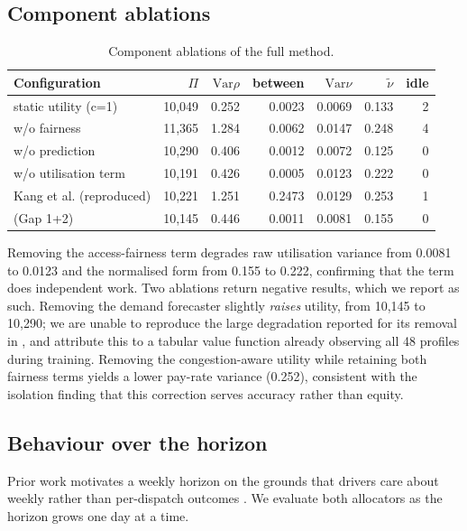 \documentclass[10pt,twocolumn]{article}
\begin{document}
\subsection{Component ablations}
\begin{table}[t]
\centering
\caption{Component ablations of the full method.}
\label{tab:ablation}
\footnotesize
\begin{tabular}{lrrrrrr}
\toprule
Configuration & \(\Pi\) & \(\mathrm{Var}\rho\) & between & \(\mathrm{Var}\nu\) & \(\tilde{\nu}\) & idle \\
\midrule
static utility (c=1) & 10,049 & 0.252 & 0.0023 & 0.0069 & 0.133 & 2 \\
w/o fairness & 11,365 & 1.284 & 0.0062 & 0.0147 & 0.248 & 4 \\
w/o prediction & 10,290 & 0.406 & 0.0012 & 0.0072 & 0.125 & 0 \\
w/o utilisation term & 10,191 & 0.426 & 0.0005 & 0.0123 & 0.222 & 0 \\
Kang et al. (reproduced) & 10,221 & 1.251 & 0.2473 & 0.0129 & 0.253 & 1 \\
(Gap 1+2) & 10,145 & 0.446 & 0.0011 & 0.0081 & 0.155 & 0 \\
\bottomrule
\end{tabular}
\end{table}
Removing the access-fairness term degrades raw utilisation variance from 0.0081 to 0.0123 and the normalised form from 0.155 to 0.222, confirming that the term does independent work. Two ablations return negative results, which we report as such. Removing the demand forecaster slightly \emph{raises} utility, from 10,145 to 10,290; we are unable to reproduce the large degradation reported for its removal in \cite{kang2024}, and attribute this to a tabular value function already observing all 48 profiles during training. Removing the congestion-aware utility while retaining both fairness terms yields a lower pay-rate variance (0.252), consistent with the isolation finding that this correction serves accuracy rather than equity.

\subsection{Behaviour over the horizon}
Prior work motivates a weekly horizon on the grounds that drivers care about weekly rather than per-dispatch outcomes \cite{kang2024}. We evaluate both allocators as the horizon grows one day at a time.
\end{document}
